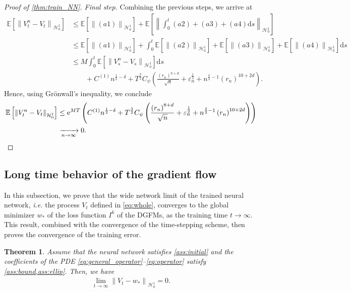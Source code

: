 \documentclass[11pt,a4paper,reqno]{amsart}
\numberwithin{equation}{section}
\theoremstyle{plain}
\newtheorem{theorem}{Theorem}[section]
\theoremstyle{definition}
\def\e{{\varepsilon}}
\def\ud{\mathrm d}
\def\ue{\mathrm e}
\newcommand{\E}{\mathbb{E}}
\newcommand{\cH}{\mathcal{H}}
\newcommand{\norm}[1]{\left\|#1 \right\|} %
\begin{document}
\begin{proof}[Proof of \cref{thm:train_NN}]
\noindent\textit{Final step.}
Combining the previous steps, we arrive at 
\begin{align*}
\E \left[ \norm{ V^n_t- V_t}_{\cH_0^1} \right] 
    &\le \E \left[ \norm{\left(a1\right)}_{\cH_0^1} \right] + \E \left[ \norm{ \int_0^t (a2) + \left(a3\right) + \left(a4\right) \ud s}_{\cH_0^1} \right] \\
    &\le \E \left[ \norm{\left(a1\right)}_{\cH_0^1} \right] +  \int_0^t \E \left[\norm{ (a2)}_{\cH_0^1}\right] + \E \left[\norm{ \left(a3\right)}_{\cH_0^1}\right] + \E \left[\norm{ \left(a4\right)}_{\cH_0^1}\right] \ud s  \\
    &\le M \int_0^t \E \left[ \norm{ V^n_s- V_s}_{\cH_0^1} \right] \ud s \\
    &\qquad + C^{\left(1\right)} n^{\frac{1}{2} - \delta} + T^{\frac{3}{2}} C_\psi \left( \frac{\left(r_n\right)^{8+d}}{\sqrt{n}} + \e_n^{\frac{1}{2}} + n^{\frac{\delta}{2}-1}\left(r_n\right)^{10 + 2d} \right).
\end{align*}
Hence, using Gr\"onwall's inequality, we conclude
\begin{align*}
\E \left[ \norm{ V^n_t- V_t}_{\cH_0^1} \right] 
    &\le \ue^{M T} \left( C^{\left(1\right)} n^{\frac{1}{2} - \delta} + T^{\frac{3}{2}} C_\psi \left( \frac{\left(r_n\right)^{8+d}}{\sqrt{n}} + \e_n^{\frac{1}{2}} + n^{\frac{\delta}{2}-1}\left(r_n\right)^{10 + 2d} \right) \right) \\
    & \xrightarrow[n \to \infty]{} 0. \qedhere  
\end{align*}
\end{proof}


\subsection{Long time behavior of the gradient flow}

In this subsection, we prove that the wide network limit of the trained neural network, \textit{i.e.} the process $V_t$ defined in \eqref{eq:whole}, converges to the global minimizer $w_*$ of the loss function $I^k$ of the DGFMs, as the training time $t\to\infty$.
This result, combined with the convergence of the time-stepping scheme, then proves the convergence of the training error.

\begin{theorem}
\label{thm:whole}
Assume that the neural network satisfies \cref{ass:initial} and the coefficients of the PDE \eqref{eq:general_operator}--\eqref{eq:operator} satisfy \cref{ass:bound,ass:ellip}.
Then, we have 
    \begin{align*}
        \lim_{t \to \infty} \norm{V_t - w_*}_{\cH_0^1} = 0.
    \end{align*}
\end{theorem}
\end{document}
